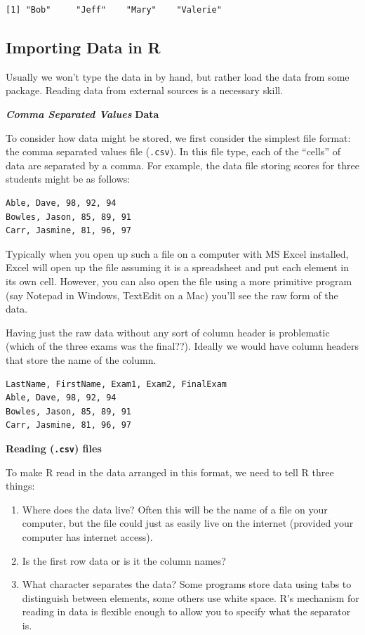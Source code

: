 \documentclass[
  letterpaper,
  DIV=11,
  numbers=noendperiod]{scrreprt}
\begin{document}
\begin{verbatim}
[1] "Bob"     "Jeff"    "Mary"    "Valerie"
\end{verbatim}

\subsection{Importing Data in R}\label{importing-data-in-r}

Usually we won't type the data in by hand, but rather load the data from
some package. Reading data from external sources is a necessary skill.

\textbf{\emph{Comma Separated Values}} \textbf{Data}

To consider how data might be stored, we first consider the simplest
file format: the comma separated values file (\texttt{.csv}). In this
file type, each of the ``cells'' of data are separated by a comma. For
example, the data file storing scores for three students might be as
follows:

\begin{verbatim}
Able, Dave, 98, 92, 94
Bowles, Jason, 85, 89, 91
Carr, Jasmine, 81, 96, 97
\end{verbatim}

Typically when you open up such a file on a computer with MS Excel
installed, Excel will open up the file assuming it is a spreadsheet and
put each element in its own cell. However, you can also open the file
using a more primitive program (say Notepad in Windows, TextEdit on a
Mac) you'll see the raw form of the data.

Having just the raw data without any sort of column header is
problematic (which of the three exams was the final??). Ideally we would
have column headers that store the name of the column.

\begin{verbatim}
LastName, FirstName, Exam1, Exam2, FinalExam
Able, Dave, 98, 92, 94
Bowles, Jason, 85, 89, 91
Carr, Jasmine, 81, 96, 97
\end{verbatim}

\textbf{Reading (\texttt{.csv}) files}

To make R read in the data arranged in this format, we need to tell R
three things:

\begin{enumerate}
\def\labelenumi{\arabic{enumi}.}
\item
  Where does the data live? Often this will be the name of a file on
  your computer, but the file could just as easily live on the internet
  (provided your computer has internet access).
\item
  Is the first row data or is it the column names?
\item
  What character separates the data? Some programs store data using tabs
  to distinguish between elements, some others use white space. R's
  mechanism for reading in data is flexible enough to allow you to
  specify what the separator is.
\end{enumerate}
\end{document}
